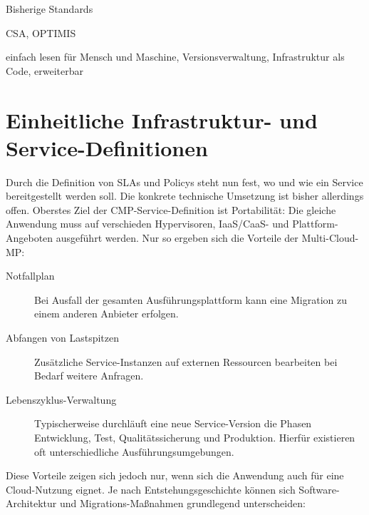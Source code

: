Bisherige Standards

CSA, OPTIMIS

einfach lesen für Mensch und Maschine, Versionsverwaltung, Infrastruktur als Code, erweiterbar



\section{Einheitliche Infrastruktur- und Service-Definitionen}

Durch die Definition von SLAs und Policys steht nun fest, wo und wie ein Service bereitgestellt werden soll. Die konkrete technische Umsetzung ist bisher allerdings offen. Oberstes Ziel der CMP-Service-Definition ist Portabilität: Die gleiche Anwendung muss auf verschieden Hypervisoren, IaaS/CaaS- und Plattform-Angeboten ausgeführt werden. Nur so ergeben sich die Vorteile der Multi-Cloud-MP:

\begin{description}
	
	\item[Notfallplan] Bei Ausfall der gesamten Ausführungsplattform kann eine Migration zu einem anderen Anbieter erfolgen.
	
	\item[Abfangen von Lastspitzen] Zusätzliche Service-Instanzen auf externen Ressourcen bearbeiten bei Bedarf weitere Anfragen.
	
	\item[Lebenszyklus-Verwaltung] Typischerweise durchläuft eine neue Service-Version die Phasen Entwicklung, Test, Qualitätssicherung und Produktion. Hierfür existieren oft unterschiedliche Ausführungsumgebungen.
	
\end{description}


\noindent
Diese Vorteile zeigen sich jedoch nur, wenn sich die Anwendung auch für eine Cloud-Nutzung eignet. Je nach Entstehungsgeschichte können sich Software-Architektur und Migrations-Maßnahmen grundlegend unterscheiden:

